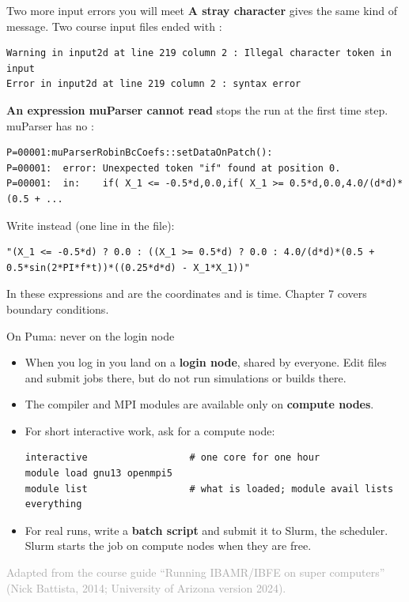 \documentclass[aspectratio=169,11pt]{beamer}
\newcommand{\sourcecredit}[1]{\vfill\hfill{\tiny\textcolor{DarkGray}{#1}}}
\begin{document}
\begin{frame}[fragile]{Two more input errors you will meet}
\textbf{A stray character} gives the same kind of message. Two course input files ended with \code{\textbackslash\textbackslash}:
\begin{lstlisting}
Warning in input2d at line 219 column 2 : Illegal character token in input
Error in input2d at line 219 column 2 : syntax error
\end{lstlisting}
\textbf{An expression muParser cannot read} stops the run at the first time step. muParser has no :
\begin{lstlisting}
P=00001:muParserRobinBcCoefs::setDataOnPatch():
P=00001:  error: Unexpected token "if" found at position 0.
P=00001:  in:    if( X_1 <= -0.5*d,0.0,if( X_1 >= 0.5*d,0.0,4.0/(d*d)*(0.5 + ...
\end{lstlisting}
Write  instead (one line in the file):
\begin{lstlisting}[style=tiny]
"(X_1 <= -0.5*d) ? 0.0 : ((X_1 >= 0.5*d) ? 0.0 : 4.0/(d*d)*(0.5 + 0.5*sin(2*PI*f*t))*((0.25*d*d) - X_1*X_1))"
\end{lstlisting}
\small In these expressions  and  are the coordinates and  is time. Chapter 7 covers boundary conditions.
\end{frame}

\begin{frame}[fragile]{On Puma: never on the login node}
\begin{itemize}
  \item When you log in you land on a \textbf{login node}, shared by everyone. Edit files and submit jobs there, but do not run simulations or builds there.
  \item The compiler and MPI modules are available only on \textbf{compute nodes}.
  \item For short interactive work, ask for a compute node:
\begin{lstlisting}[style=shell]
interactive                  # one core for one hour
module load gnu13 openmpi5
module list                  # what is loaded; module avail lists everything
\end{lstlisting}
  \item For real runs, write a \textbf{batch script} and submit it to Slurm, the scheduler. Slurm starts the job on compute nodes when they are free.
\end{itemize}
\sourcecredit{Adapted from the course guide ``Running IBAMR/IBFE on super computers'' (Nick Battista, 2014; University of Arizona version 2024).}
\end{frame}
\end{document}
